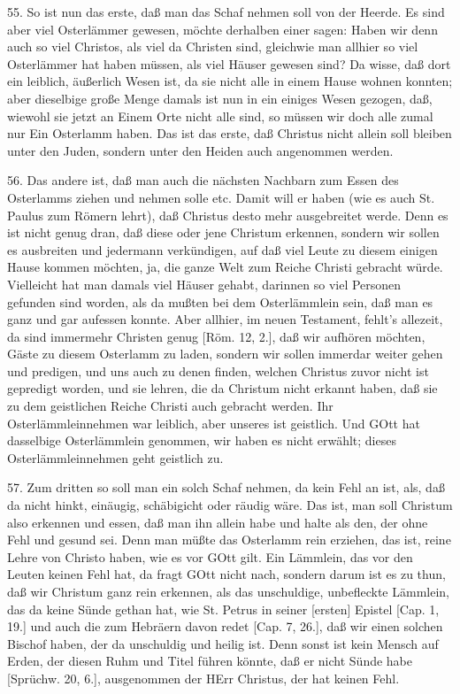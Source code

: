 55. So ist nun das erste, daß man das Schaf nehmen soll von der Heerde. Es sind aber viel Osterlämmer gewesen, möchte derhalben einer sagen: Haben wir denn auch so viel Christos, als viel da Christen sind, gleichwie man allhier so viel Osterlämmer hat haben müssen, als viel Häuser gewesen sind? Da wisse, daß dort ein leiblich, äußerlich Wesen ist, da sie nicht alle in einem Hause wohnen konnten; aber dieselbige große Menge damals ist nun in ein einiges Wesen gezogen, daß, wiewohl sie jetzt an Einem Orte nicht alle sind, so müssen wir doch alle zumal nur Ein Osterlamm haben. Das ist das erste, daß Christus nicht allein soll bleiben unter den Juden, sondern unter den Heiden auch angenommen werden.

56. Das andere ist, daß man auch die nächsten Nachbarn zum Essen des Osterlamms ziehen und nehmen solle etc. Damit will er haben (wie es auch St. Paulus zum Römern lehrt), daß Christus desto mehr ausgebreitet werde. Denn es ist nicht genug dran, daß diese oder jene Christum erkennen, sondern wir sollen es ausbreiten und jedermann verkündigen, auf daß viel Leute zu diesem einigen Hause kommen möchten, ja, die ganze Welt zum Reiche Christi gebracht würde. Vielleicht hat man damals viel Häuser gehabt, darinnen so viel Personen gefunden sind worden, als da mußten bei dem Osterlämmlein sein, daß man es ganz und gar aufessen konnte. Aber allhier, im neuen Testament, fehlt's allezeit, da sind immermehr Christen genug [Röm. 12, 2.], daß wir aufhören möchten, Gäste zu diesem Osterlamm zu laden, sondern wir sollen immerdar weiter gehen und predigen, und uns auch zu denen finden, welchen Christus zuvor nicht ist gepredigt worden, und sie lehren, die da Christum nicht erkannt haben, daß sie zu dem geistlichen Reiche Christi auch gebracht werden. Ihr Osterlämmleinnehmen war leiblich, aber unseres ist geistlich. Und GOtt hat dasselbige Osterlämmlein genommen, wir haben es nicht erwählt; dieses Osterlämmleinnehmen geht geistlich zu.

57. Zum dritten so soll man ein solch Schaf nehmen, da kein Fehl an ist, als, daß da nicht hinkt, einäugig, schäbigicht oder räudig wäre. Das ist, man soll Christum also erkennen und essen,
daß man ihn allein habe und halte als den, der ohne Fehl und gesund sei. Denn man müßte das Osterlamm rein erziehen, das ist, reine Lehre von Christo haben, wie es vor GOtt gilt. Ein Lämmlein, das vor den Leuten keinen Fehl hat, da fragt GOtt nicht nach, sondern darum ist es zu thun, daß wir Christum ganz rein erkennen, als das unschuldige, unbefleckte Lämmlein, das da keine Sünde gethan hat, wie St. Petrus in seiner [ersten] Epistel [Cap. 1, 19.] und auch die zum Hebräern davon redet [Cap. 7, 26.], daß wir einen solchen Bischof haben, der da unschuldig und heilig ist. Denn sonst ist kein Mensch auf Erden, der diesen Ruhm und Titel führen könnte, daß er nicht Sünde habe [Sprüchw. 20, 6.], ausgenommen der HErr Christus, der hat keinen Fehl.


